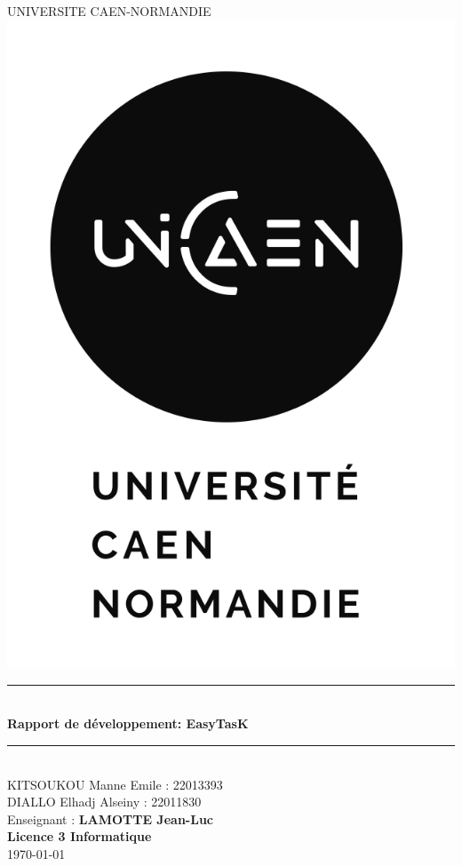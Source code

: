 \documentclass[12pt]{article}
\begin{document}
    \begin{titlepage}
        \newcommand{\HRule}{\rule{\linewidth}{0.5mm}}
        \center
        \textsc{\LARGE
        UNIVERSITE CAEN-NORMANDIE
        } \\[1cm]
        \includegraphics[scale=1]{images/LOGO-UNICAEN_V-2.2-N} \\[1cm]
        \HRule \\[0.4cm]
        { \huge \bfseries Rapport de développement: EasyTasK\\[0.15cm] }
        \HRule \\[1.5cm]
        KITSOUKOU Manne Emile : 22013393\\[1cm]
        DIALLO Elhadj Alseiny : 22011830
        \\[1cm]
        Enseignant : \textbf{LAMOTTE Jean-Luc}\\
        \textbf{Licence 3 Informatique}\\
        \today \\ [1cm]
    \end{titlepage}
    \newpage
    \tableofcontents
    \newpage
\end{document}
